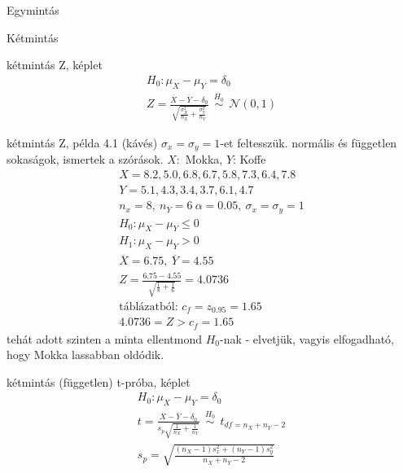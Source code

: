 \documentclass[12pt]{amsbook}
\begin{document}
\begin{spacing}{1.5}
\begin{section}{Egymintás}
\end{section}%



\begin{section}{Kétmintás}
\label{2m}
\begin{subsection}{kétmintás Z, képlet }
\label{2mzk}
   \begin{gather*}
   H_0: \mu_X - \mu_Y = \delta_0\\
   Z=\frac{\overline{X}-\overline{Y} - \delta_0}
   {\sqrt{\frac{\sigma_X^2}{n_X}+ \frac{\sigma_Y^2}{n_Y} } } \ \
   \overset{H_0}{\sim} \ \ {\mathcal N}(0,1)
   \end{gather*}
\end{subsection}%


\begin{subsection}{kétmintás Z, példa }
\label{2mzp}
   4.1 (kávés) $\sigma_x=\sigma_y=1$-et feltesszük. normális és
   független sokaságok, ismertek a szórások.
   $X:$ Mokka, $Y$: Koffe
   \begin{gather*}
   X=8.2, 5.0, 6.8, 6.7, 5.8, 7.3, 6.4, 7.8\\
   Y=5.1, 4.3, 3.4, 3.7, 6.1, 4.7   \\
   n_x=8,\ n_Y=6\  \alpha=0.05,\ \sigma_x=\sigma_y=1 \\
   H_{0}: \mu_X-\mu_Y \le 0 \\
   H_{1}: \mu_X-\mu_Y > 0 \\
   \overline{X}=6.75,\ \overline{Y}=4.55\\
   Z=\frac{6.75-4.55}{\sqrt{\frac{1}{8}+\frac{1}{6}}} = 4.0736\\
   \text{táblázatból: } c_f = z_{0.95}=1.65\\
   4.0736=Z > c_f=1.65
   \end{gather*}
   tehát adott szinten a minta ellentmond $H_0$-nak - elvetjük,
   vagyis elfogadható, hogy Mokka lassabban oldódik.
\end{subsection}%


\begin{subsection}{kétmintás (független) t-próba, képlet}
\label{2mtk}
   \begin{gather*}
   H_0: \mu_X - \mu_Y = \delta_{0}\\
   t=\frac{\overline{X}-\overline{Y} - \delta_{0}}{s_p\sqrt{\frac{1}{n_X}+ \frac{1}{n_Y} } } \ \
   \overset{H_0}{\sim} \ \ t_{df=n_X+n_Y-2}\\
   s_p=\sqrt{ \frac{(n_X-1)s_x^2+(n_Y-1)s_y^2}{n_X+n_Y-2}}
   \end{gather*}
\end{subsection}%





\end{section}
\end{spacing}
\end{document}
